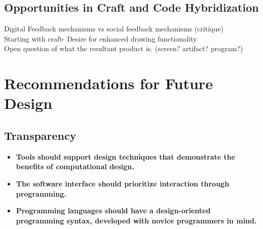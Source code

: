 \documentclass{sigchi}
\begin{document}
\subsection{Opportunities in Craft and Code Hybridization}
Digital Feedback mechanisms vs social feedback mechanisms (critique)\\
Starting with craft- Desire for enhanced drawing functionality\\
Open question of what the resultant product is. (screen? artifact? program?)

\section{Recommendations for Future Design}
\subsection{Transparency}
\begin{itemize}
\item \textbf{Tools should support design techniques that demonstrate the benefits of computational design.} %
				
\item \textbf{The software interface should prioritize interaction through programming.} %

\item \textbf{Programming languages should have a design-oriented programming syntax, developed with novice programmers in mind.} %
\end{itemize}
\end{document}
